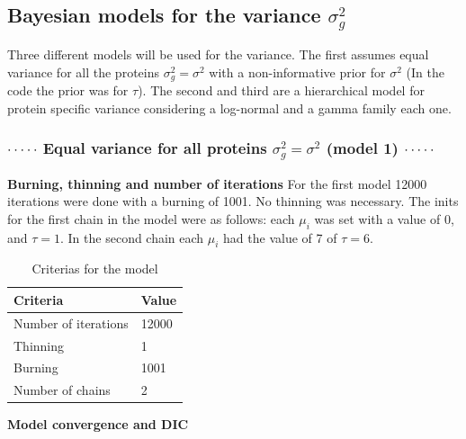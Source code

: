 \documentclass{article}
\begin{document}
\subsection*{ Bayesian models for the variance $\sigma_g^2$}

Three different models will be used for the variance. The first assumes equal variance for all the proteins $\sigma_g^2 = \sigma^2$ with a non-informative prior for $\sigma^2$ (In the code the prior was for $\tau$). The second and third are a hierarchical model for protein specific variance considering a log-normal and a gamma family each one.

\subsubsection*{ $\cdot\cdot\cdot\cdot\cdot$ Equal variance for all proteins $\sigma_g^2 = \sigma^2$ (model 1) $\cdot\cdot\cdot\cdot\cdot$}

\textbf{Burning, thinning and number of iterations}
For the first model 12000 iterations were done with a burning of 1001. No thinning was necessary. The inits for the first chain in the model were as follows: each $\mu_i$ was set with a value of 0, and $\tau=1$. In the second chain each $\mu_i$ had the value of 7 of $\tau = 6$. 

\begin{table}[ht!]
\centering
\caption{Criterias for the model}
\begin{tabular}{|l|l|}
\hline
Criteria             & Value \\ \hline
Number of iterations & 12000 \\ \hline
Thinning             & 1    \\ \hline
Burning              & 1001  \\ \hline
Number of chains     & 2     \\ \hline
\end{tabular}
\end{table}

\textbf{Model convergence and DIC}
\end{document}
